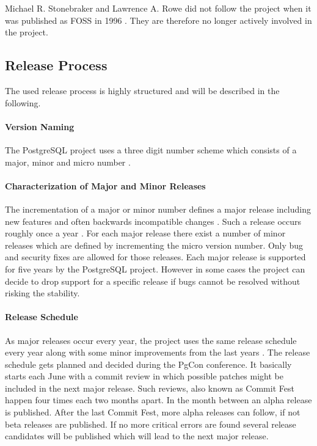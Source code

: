 Michael R. Stonebraker and Lawrence A. Rowe did not follow the project when it
was published as \ac{FOSS} in 1996 \cite{PostgreSQLHistory}. They are therefore
no longer actively involved in the project.

\subsection{Release Process}

The used release process is highly structured and will be described in the
following.

\paragraph{Version Naming}

The PostgreSQL project uses a three digit number scheme which consists of a
major, minor and micro number \cite{PostgreSQLVersioning}.

\paragraph{Characterization of Major and Minor Releases}

The incrementation of a major or minor number defines a major release including
new features and often backwards incompatible changes
\cite{PostgreSQLVersioning}. Such a release occurs roughly once a year
\cite{PostgreSQLDevelopment,PostgreSQLFAQ}. For each major release there exist
a number of minor releases which are defined by incrementing the micro version
number. Only bug and security fixes are allowed for those releases. Each major
release is supported for five years by the PostgreSQL project. However in some
cases the project can decide to drop support for a specific release if bugs
cannot be resolved without risking the stability.

\paragraph{Release Schedule}

As major releases occur every year, the project uses the same release schedule
every year along with some minor improvements from the last years
\cite{PostgreSQLDevelopment}. The release schedule gets planned and decided
during the PgCon conference. It basically starts each June with a commit review
in which possible patches might be included in the next major release. Such
reviews, also known as Commit Fest happen four times each two months apart. In
the month between an alpha release is published. After the last Commit Fest,
more alpha releases can follow, if not beta releases are published. If no more
critical errors are found several release candidates will be published which
will lead to the next major release.

